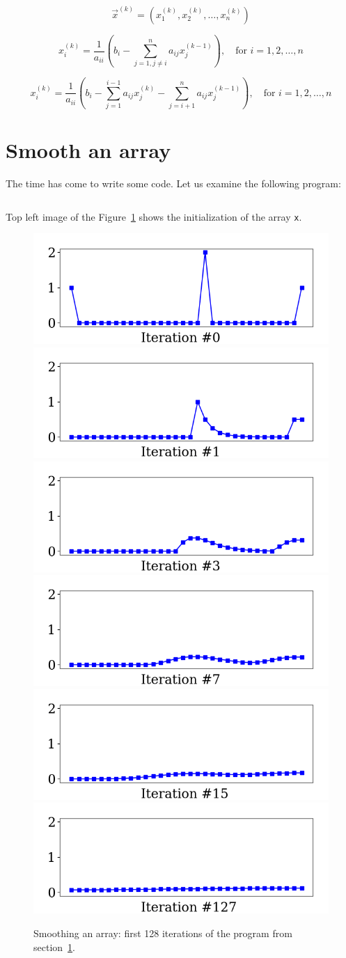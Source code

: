 \documentclass[notitlepage]{report}
\begin{document}
$$\vec{x}^{(k)}=\left(x_1^{(k)}, x_2^{(k)}, \dots, x_n^{(k)}\right)$$

$$
x_i^{(k)} = \frac{1}{a_{ii}} \left(b_i - \sum\limits_{j=1,j\neq i}^n a_{ij}x_j^{(k-1)} \right), \quad \text{for } i=1,2,\dots,n
$$

$$
x_i^{(k)} = \frac{1}{a_{ii}} \left(b_i - \sum\limits_{j=1}^{i-1} a_{ij}x_j^{(k)} -  \sum\limits_{j=i+1}^n a_{ij}x_j^{(k-1)} \right), \quad \text{for } i=1,2,\dots,n
$$


\section{Smooth an array}
\label{sec:arraysmooth}
The time has come to write some code. Let us examine the following program:
\inputminted[frame=single,linenos=true]{python}{lst_linsys01.py}

Top left image of the Figure~\ref{fig:linsys_smooth} shows the initialization of the array \texttt{x}.

\begin{figure}[ht]
    \centering
    \includegraphics[width=.32\linewidth]{linsys_smooth0.png}
    \includegraphics[width=.32\linewidth]{linsys_smooth1.png}
    \includegraphics[width=.32\linewidth]{linsys_smooth2.png}
    \includegraphics[width=.32\linewidth]{linsys_smooth3.png}
    \includegraphics[width=.32\linewidth]{linsys_smooth4.png}
    \includegraphics[width=.32\linewidth]{linsys_smooth5.png}
    \caption{Smoothing an array: first 128 iterations of the program from section~\ref{sec:arraysmooth}.}
    \label{fig:linsys_smooth}
\end{figure}
\end{document}
